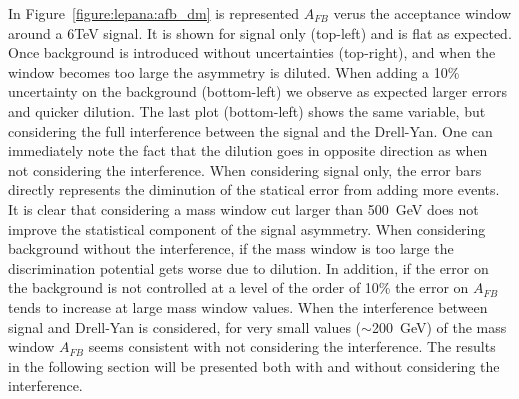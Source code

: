 \label{subsubsection:opti}
In Figure~\ref{figure:lepana:afb_dm} is represented $A_{FB}$ verus the acceptance window around a 6TeV signal. 
It is shown for signal only (top-left) and is flat as expected. Once background is introduced without uncertainties (top-right), and when the window 
becomes too large the asymmetry is diluted. When adding a 10\% uncertainty on the background (bottom-left) we observe as expected larger errors and quicker dilution.
The last plot (bottom-left) shows the same variable, but considering the full interference between the signal and the Drell-Yan. One can immediately 
note the fact that the dilution goes in opposite direction as when not considering the interference. 
When considering signal only, the error bars directly represents the diminution of the statical error from adding more events. It is clear that considering a mass window cut 
larger than 500~GeV does not improve the statistical component of the signal asymmetry. When considering background without the interference, if the mass window is too large 
the discrimination potential gets worse due to dilution. In addition, if the error on the background is not controlled at a level of the order of 10\% the error on $A_{FB}$ tends to 
increase at large mass window values. When the interference between signal and Drell-Yan is considered, for very small values ($\sim$200~GeV) of the mass window 
$A_{FB}$ seems consistent with not considering the interference. 
The results in the following section will be presented both with and without considering the interference.

